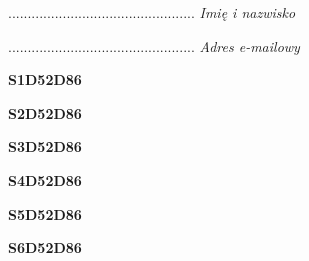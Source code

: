 \begin{turn}{90}\begin{minipage}{\linewidth} \vspace{20mm} ................................................  \textit{Imię i nazwisko}\end{minipage}\end{turn}

\begin{turn}{90}\begin{minipage}{\linewidth} \vspace{20mm} ................................................  \textit{Adres e-mailowy}\end{minipage}\end{turn}

\begin{turn}{90}\huge \begin{minipage}{\linewidth} \vspace{10mm}\textbf{S1D52D86}\end{minipage}\end{turn}

\begin{turn}{90}\huge \begin{minipage}{\linewidth} \vspace{10mm}\textbf{S2D52D86}\end{minipage}\end{turn}

\begin{turn}{90}\huge \begin{minipage}{\linewidth} \vspace{10mm}\textbf{S3D52D86}\end{minipage}\end{turn}

\begin{turn}{90}\huge \begin{minipage}{\linewidth} \vspace{10mm}\textbf{S4D52D86}\end{minipage}\end{turn}

\begin{turn}{90}\huge \begin{minipage}{\linewidth} \vspace{10mm}\textbf{S5D52D86}\end{minipage}\end{turn}

\begin{turn}{90}\huge \begin{minipage}{\linewidth} \vspace{10mm}\textbf{S6D52D86}\end{minipage}\end{turn}

